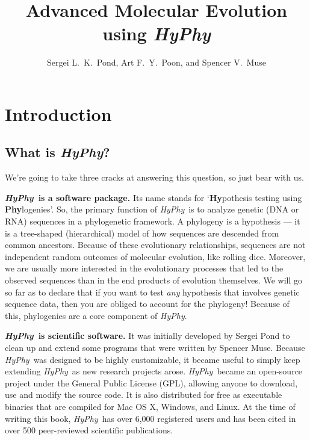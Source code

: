 \documentclass[12pt]{book}
\newcommand{\hyphy}{\textit{HyPhy}}
\begin{document}
\title{Advanced Molecular Evolution using {\it HyPhy}}
\author{Sergei L.~K.~Pond, Art F.~Y.~Poon, and Spencer V.~Muse}
\date{}
\maketitle

\chapter {Introduction}

\section {What is \hyphy?}

We're going to take three cracks at answering this question, so just bear with us.

\textbf{\hyphy\ is a software package.}  Its name stands for `{\bf Hy}pothesis testing using {\bf Phy}logenies'.  So, the primary function of \hyphy\ is to analyze genetic (DNA or RNA) sequences in a phylogenetic framework.  A phylogeny is a hypothesis --- it is a tree-shaped (hierarchical) model of how sequences are descended from common ancestors.  Because of these evolutionary relationships, sequences are not independent random outcomes of molecular evolution, like rolling dice.  
Moreover, we are usually more interested in the evolutionary processes that led to the observed sequences than in the end products of evolution themselves.  We will go so far as to declare that if you want to test {\it any} hypothesis that involves genetic sequence data, then you are obliged to account for the phylogeny!  Because of this, phylogenies are a core component of {\it HyPhy}.

\textbf{\hyphy\ is scientific software.}  It was initially developed by Sergei Pond to clean up and extend some programs that were written by Spencer Muse.  Because \hyphy\ was designed to be highly customizable, it became useful to simply keep extending \hyphy\ as new research projects arose.  \hyphy\ became an open-source project under the General Public License (GPL), allowing anyone to download, use and modify the source code.  It is also distributed for free as executable binaries that are compiled for Mac OS X, Windows, and Linux.  At the time of writing this book, \hyphy\ has over 6,000 registered users and has been cited in over 500 peer-reviewed scientific publications.  
\end{document}
